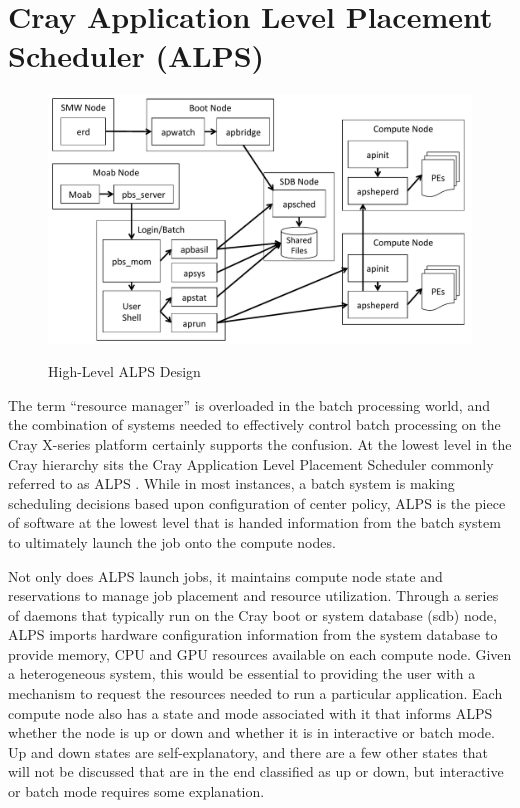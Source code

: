 \section{Cray Application Level Placement Scheduler (ALPS)}

\begin{figure}
  \centering
  \includegraphics[width=6.5in]{figures/alps_hilevel.pdf}\\
  \caption{High-Level ALPS Design}\label{fig:alps_hilevel}
\end{figure}

The term ``resource manager'' is overloaded in the batch processing world, and
the combination of systems needed to effectively control batch processing on
the Cray X-series platform certainly supports the confusion.  At the lowest
level in the Cray hierarchy sits the Cray Application Level Placement Scheduler
commonly referred to as ALPS \cite{alps}.  While in most instances, a batch
system is making scheduling decisions based upon configuration of center
policy, ALPS is the piece of software at the lowest level that is handed
information from the batch system to ultimately launch the job onto the compute
nodes.

Not only does ALPS launch jobs, it maintains compute node state and
reservations to manage job placement and resource utilization.  Through a
series of daemons that typically run on the Cray boot or system database (sdb)
node, ALPS imports hardware configuration information from the system database
to provide memory, CPU and GPU resources available on each compute node.  Given
a heterogeneous system, this would be essential to providing the user with a
mechanism to request the resources needed to run a particular application.
Each compute node also has a state and mode associated with it that informs
ALPS whether the node is up or down and whether it is in interactive or batch
mode.  Up and down states are self-explanatory, and there are a few other
states that will not be discussed that are in the end classified as up or down,
but interactive or batch mode requires some explanation.  

